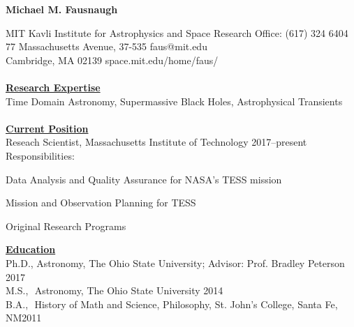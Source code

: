 \documentclass[letterpaper,11pt]{article}
\begin{document}
\begin{center}
\huge\bfseries{Michael M. Fausnaugh}
\end{center}

\noindent MIT Kavli Institute for Astrophysics and Space Research \hfill Office: (617) 324 6404 \\
77 Massachusetts Avenue, 37-535  \hfill faus@mit.edu\\
Cambridge, MA 02139 \hfill space.mit.edu/home/faus/
\\
\\
\underline{\textbf{Research Expertise}}\\
Time Domain Astronomy, Supermassive Black Holes, Astrophysical Transients
\\
\\
\underline{\textbf{Current Position}} \\
Reseach Scientist, Massachusetts Institute of Technology \hfill 2017--present\\
Responsibilities: \begin{compactitem}
   \item Data Analysis and Quality Assurance for NASA's TESS mission
   \item Mission and Observation Planning for TESS
   \item Original Research Programs
   \end{compactitem}	
\underline{\textbf{Education}}    \\
Ph.D., Astronomy, The Ohio State University;  Advisor:  Prof. Bradley Peterson \hfill 2017\\
M.S.,  \,\,Astronomy, The Ohio State University \hfill 2014\\
B.A., \,\,History of Math and Science, Philosophy, St. John's College, Santa Fe, NM\hfill 2011\\
\end{document}
